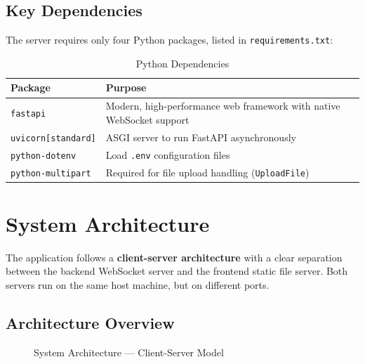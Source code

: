 \documentclass[12pt, a4paper]{article}
\begin{document}
\subsection{Key Dependencies}

The server requires only four Python packages, listed in \texttt{requirements.txt}:

\begin{table}[H]
    \centering
    \caption{Python Dependencies}
    \begin{tabularx}{\textwidth}{l X}
        \toprule
        \textbf{Package} & \textbf{Purpose} \\
        \midrule
        \texttt{fastapi}          & Modern, high-performance web framework with native WebSocket support \\
        \texttt{uvicorn[standard]} & ASGI server to run FastAPI asynchronously \\
        \texttt{python-dotenv}     & Load \texttt{.env} configuration files \\
        \texttt{python-multipart}  & Required for file upload handling (\texttt{UploadFile}) \\
        \bottomrule
    \end{tabularx}
\end{table}


\section{System Architecture}

The application follows a \textbf{client-server architecture} with a clear separation between the backend WebSocket server and the frontend static file server. Both servers run on the same host machine, but on different ports.

\subsection{Architecture Overview}

\begin{figure}[H]
    \centering
    \caption{System Architecture — Client-Server Model}
    \label{fig:architecture}
\end{figure}
\end{document}
